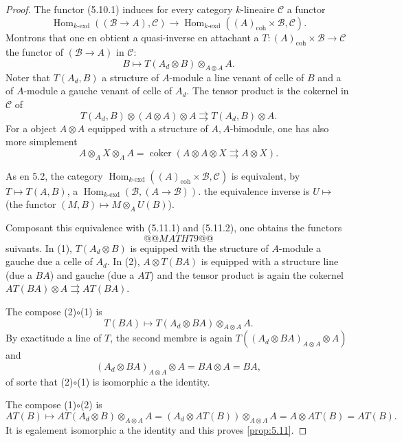 \documentclass[12pt,a4paper]{article}
\theoremstyle{plain}
\theoremstyle{definition}
\theoremstyle{remark}
\DeclareMathOperator{\Hom}{Hom}
\DeclareMathOperator{\coker}{coker}
\begin{document}
\begin{proof}
The functor (5.10.1) induces for every category $k$-lineaire $\mathcal{C}$ a functor
\begin{equation}\label{eq:5.11.1}
\Hom_{k\text{-}\mathrm{exd}}((\mathcal{B} \to A), \mathcal{C}) \to \Hom_{k\text{-}\mathrm{exd}}((A)_\mathrm{coh} \times \mathcal{B}, \mathcal{C}).
\end{equation}
Montrons that one en obtient a quasi-inverse en attachant a $T : (A)_\mathrm{coh} \times \mathcal{B} \to \mathcal{C}$ the functor of $(\mathcal{B} \to A)$ in $\mathcal{C}$:
\begin{equation}\label{eq:5.11.2}
B \mapsto T(A_d \otimes B) \otimes_{A \otimes A} A.
\end{equation}
Noter that $T(A_d, B)$ a structure of $A$-module a line venant of celle of $B$ and a of $A$-module a gauche venant of celle of $A_d$. The tensor product is the cokernel in $\mathcal{C}$ of
\[
T(A_d, B) \otimes (A \otimes A) \otimes A \rightrightarrows T(A_d, B) \otimes A.
\]
For a object $A \otimes A$ equipped with a structure of $A,A$-bimodule, one has also more simplement
\begin{equation}\label{eq:5.11.3}
A \otimes_A X \otimes_A A = \coker(A \otimes A \otimes X \rightrightarrows A \otimes X).
\end{equation}

As en 5.2, the category $\Hom_{k\text{-}\mathrm{exd}}((A)_\mathrm{coh} \times \mathcal{B}, \mathcal{C})$ is equivalent, by $T \mapsto T(A,B)$, a $\Hom_{k\text{-}\mathrm{exd}}(\mathcal{B}, (A \to \mathcal{B}))$. the equivalence inverse is $U \mapsto$ (the functor $(M,B) \mapsto M \otimes_A U(B)$).

Composant this equivalence with (5.11.1) and (5.11.2), one obtains the functors
\[
@@MATH79@@
\]
suivants.
In (1), $T(A_d \otimes B)$ is equipped with the structure of $A$-module a gauche due a celle of $A_d$. In (2), $A \otimes T(BA)$ is equipped with a structure line (due a $BA$) and gauche (due a $AT$) and the tensor product is again the cokernel $AT(BA) \otimes A \rightrightarrows AT(BA)$.

The compose (2)$\circ$(1) is
\[
T(BA) \mapsto T(A_d \otimes BA) \otimes_{A \otimes A} A.
\]
By exactitude a line of $T$, the second membre is again $T((A_d \otimes BA)_{A \otimes A} \otimes A)$ and
\[
(A_d \otimes BA)_{A \otimes A} \otimes A = BA \otimes A = BA,
\]
of sorte that (2)$\circ$(1) is isomorphic a the identity.

The compose (1)$\circ$(2) is
\[
AT(B) \mapsto AT(A_d \otimes B) \otimes_{A \otimes A} A = (A_d \otimes AT(B)) \otimes_{A \otimes A} A = A \otimes AT(B) = AT(B).
\]
It is egalement isomorphic a the identity and this proves \ref{prop:5.11}.
\end{proof}
\end{document}
